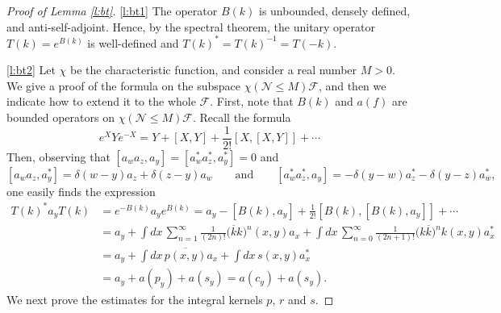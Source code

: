 \documentclass[11pt,a4paper]{scrartcl}
\newcommand{\N}{\mathcal{N}}
\begin{document}
\begin{proof}[Proof of Lemma \ref{l:bt}]
  \ref{l:bt1} The operator $B(k)$ is unbounded, densely defined, and
  anti-self-adjoint. Hence, by the spectral theorem, the unitary operator
  $T(k) = e^{B(k)}$ is well-defined and $T(k)^* = T(k)^{-1} = T(-k)$.


  \ref{l:bt2} Let $\chi$ be the characteristic function, and consider a real
  number $M > 0$. We give a proof of the formula on the subspace $\chi(\N \le
  M) \mathcal{F}$, and then we indicate how to extend it to the whole
  $\mathcal{F}$. First, note that $B(k)$ and $a(f)$ are bounded operators on
  $\chi(\N \le M) \mathcal{F}$. Recall the formula
  \[
    e^X Y e^{-X} = Y + [X,Y] + \frac{1}{2!} [X,[X,Y]] + \cdots
  \]
  Then, observing that $[a_w a_z, a_y] = [a_w^* a_z^*, a_y^*] = 0$ and
  \[
    [a_w a_z, a_y^*] = \delta(w-y) a_z + \delta(z-y) a_w \qquad \text{and}
    \qquad [a_w^* a_z^*, a_y] = -\delta(y-w) a_z^* - \delta(y-z) a_w^*,
  \]
  one easily finds the expression
  \begin{align*}
    T(k)^* a_y T(k) & = e^{-B(k)} a_y e^{B(k)} = a_y - [B(k), a_y] +
    \frac{1}{2!} [B(k), [B(k), a_y]] + \cdots \\
    & = a_y + \int dx \, \sum_{n=1}^\infty \frac{1}{(2n)!} \big( 
    \overline{k} k \big)^n(x,y) a_x + \int dx \, \sum_{n=0}^\infty
    \frac{1}{(2n+1)!} \big( k \overline{k} \big)^n k(x,y) a_x^* \\
    & = a_y + \int dx \, \overline{p(x,y)} a_x + \int dx \, s(x,y) a_x^* \\
    & = a_y + a(p_y) + a(s_y) = a(c_y) + a(s_y).
  \end{align*}
  We next prove the estimates for the integral kernels $p$, $r$ and $s$. 



\end{proof}
\end{document}
